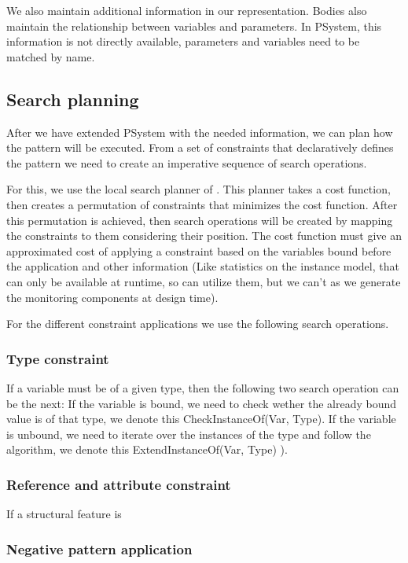 We also maintain additional information in our representation. 
Bodies also maintain the relationship between variables and parameters. 
In PSystem, this information is not directly available, parameters and variables need to be matched by name.

\subsection{Search planning}

After we have extended PSystem with the needed information, we can plan how the pattern will be executed.
From a set of constraints that declaratively defines the pattern we need to create an imperative sequence of search operations.

For this, we use the local search planner of \viatra{}.
This planner takes a cost function, then creates a permutation of constraints that minimizes the cost function. 
After this permutation is achieved, then search operations will be created by mapping the constraints to them considering their position.
The cost function must give an approximated cost of applying a constraint based on the variables bound before the application and other information (Like statistics on the instance model, that can only be available at runtime, so \viatra{} can utilize them, but we can't as we generate the monitoring components at design time). 

For the different constraint applications we use the following search operations.

\subsubsection{Type constraint}
If a variable must be of a given type, then the following two search operation can be the next:
If the variable is bound, we need to check wether the already bound value is of that type, we denote this CheckInstanceOf(Var, Type).
If the variable is unbound, we need to iterate over the instances of the type and follow the algorithm, we denote this ExtendInstanceOf(Var, Type) ).


\subsubsection{Reference and attribute constraint}

If a structural feature is 


\subsubsection{Negative pattern application}


